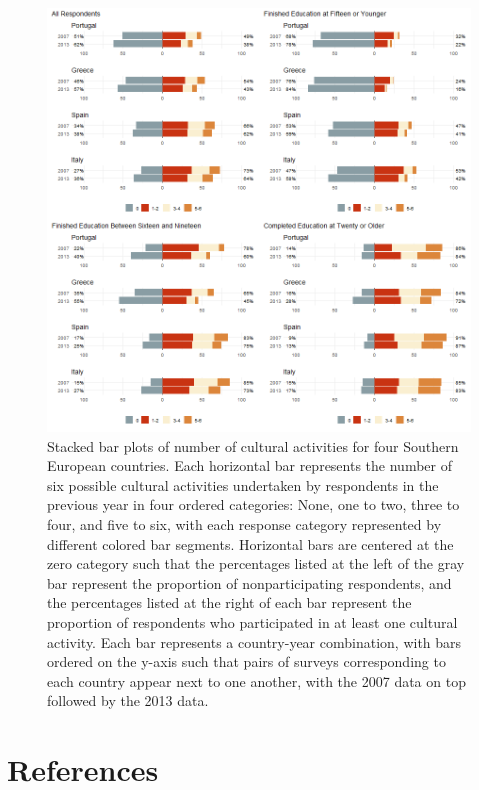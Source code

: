 \documentclass{article}
\begin{document}
\begin{figure}
    \centering
    \includegraphics{Plots/cult-cat-by-year-by-country-combo.png}
    \caption{Stacked bar plots of number of cultural activities for four Southern European countries. Each horizontal bar represents the number of six possible cultural activities undertaken by respondents in the previous year in four ordered categories: None, one to two, three to four, and five to six, with each response category represented by different colored bar segments. Horizontal bars are centered at the zero category such that the percentages listed at the left of the gray bar represent the proportion of nonparticipating respondents, and the percentages listed at the right of each bar represent the proportion of respondents who participated in at least one cultural activity. Each bar represents a country-year combination, with bars ordered on the y-axis such that pairs of surveys corresponding to each country appear next to one another, with the 2007 data on top followed by the 2013 data.}
    \label{fig: main}
\end{figure}

\section*{References}
\noindent
\end{document}
